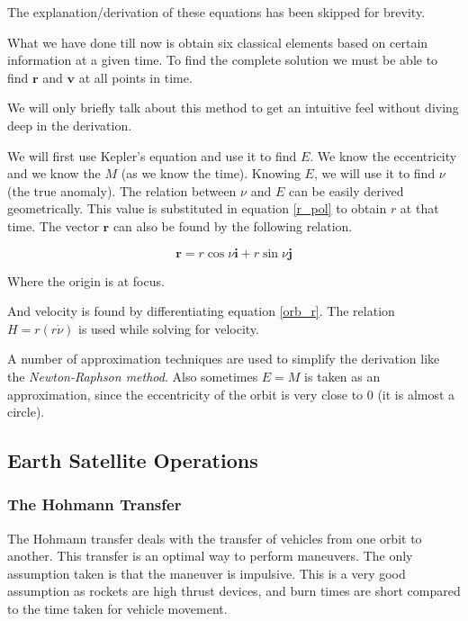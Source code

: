 \documentclass{article}
\theoremstyle{definition}
\begin{document}
The explanation/derivation of these equations has been skipped for brevity.

What we have done till now is obtain six classical elements based on certain information at a given time.
To find the complete solution we must be able to find $\boldsymbol{r}$ and $\boldsymbol{v}$ at all points in time.
\medskip

We will only briefly talk about this method to get an intuitive feel without diving deep in the derivation.

We will first use Kepler's equation and use it to find $E$. We know the eccentricity and we know the $M$ (as we know the time).
Knowing $E$, we will use it to find $\nu$ (the true anomaly). The relation between $\nu$ and $E$ can be easily derived geometrically. 
This value is substituted in equation \ref{r_pol} to obtain $r$ at that time.
The vector $\boldsymbol{r}$ can also be found by the following relation.

\begin{equation}\label{orb_r}
    \boldsymbol{r}= r\cos{\nu}\boldsymbol{i} + r\sin{\nu}\boldsymbol{j}
\end{equation}

Where the origin is at focus.

And velocity is found by differentiating equation \ref{orb_r}. 
The relation $H = r(r\Dot{\nu})$ is used while solving for velocity. 

A number of approximation techniques are used to simplify the derivation like the \emph{Newton-Raphson method}.
Also sometimes $E=M$ is taken as an approximation, since the eccentricity of the orbit is very close to 0 (it is almost a circle).

\subsection{Earth Satellite Operations}

\subsubsection{The Hohmann Transfer}

The Hohmann transfer deals with the transfer of vehicles from one orbit to another.
This transfer is an optimal way to perform maneuvers. The only assumption taken is that the maneuver is impulsive.
This is a very good assumption as rockets are high thrust devices, and burn times are short compared to the time taken for vehicle movement.
\end{document}
